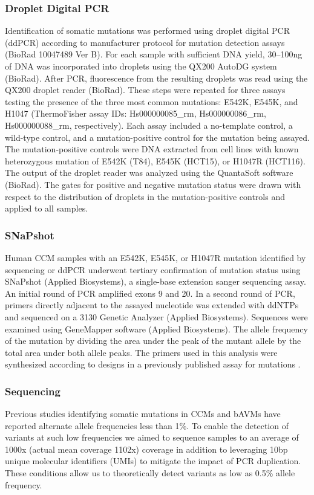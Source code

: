 \subsubsection{Droplet Digital PCR}
Identification of somatic  mutations was performed using droplet digital PCR (ddPCR) according to manufacturer protocol for mutation detection assays (BioRad 10047489 Ver B). For each sample with sufficient DNA yield, 30--100ng of DNA was incorporated into droplets using the QX200 AutoDG system (BioRad). After PCR, fluorescence from the resulting droplets was read using the QX200 droplet reader (BioRad). These steps were repeated for three assays testing the presence of the three most common  mutations: E542K, E545K, and H1047 (ThermoFisher assay IDs: Hs000000085\_rm, Hs000000086\_rm, Hs000000088\_rm, respectively). Each assay included a no-template control, a wild-type control, and a mutation-positive control for the mutation being assayed. The mutation-positive controls were DNA extracted from cell lines with known heterozygous mutation of E542K (T84), E545K (HCT15), or H1047R (HCT116).  The output of the droplet reader was analyzed using the QuantaSoft software (BioRad). The gates for positive and negative mutation status were drawn with respect to the distribution of droplets in the mutation-positive controls and applied to all samples. 

\subsubsection{SNaPshot}
Human CCM samples with an E542K, E545K, or H1047R  mutation identified by sequencing or ddPCR underwent tertiary confirmation of mutation status using SNaPshot (Applied Biosystems), a single-base extension sanger sequencing assay. An initial round of PCR amplified exons 9 and 20. In a second round of PCR, primers directly adjacent to the assayed nucleotide was extended with ddNTPs and sequenced on a 3130 Genetic Analyzer (Applied Biosystems). Sequences were examined using GeneMapper software (Applied Biosystems). The allele frequency of the mutation by dividing the area under the peak of the mutant allele by the total area under both allele peaks. The primers used in this analysis were synthesized according to designs in a previously published assay for  mutations \citep{hurst2009}.

\subsubsection{Sequencing}
Previous studies identifying somatic mutations in CCMs and bAVMs have reported alternate allele frequencies less than 1\%. To enable the detection of variants at such low frequencies we aimed to sequence samples to an average of 1000x (actual mean coverage 1102x) coverage in addition to leveraging 10bp unique molecular identifiers (UMIs) to mitigate the impact of PCR duplication. These conditions allow us to theoretically detect variants as low as 0.5\% allele frequency. 

